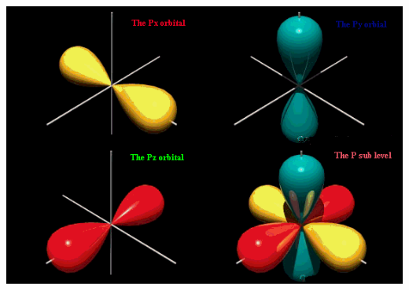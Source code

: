 \documentclass[%
xcolor=pdftex,dvipsnames,table%
]{beamer}
\begin{document}
{
\begin{frame}[plain]
\end{frame}
}
\begin{frame}
  \includegraphics[scale=0.4]{porbital}
\end{frame}
{
\begin{frame}[plain]
\end{frame}
}
\end{document}
